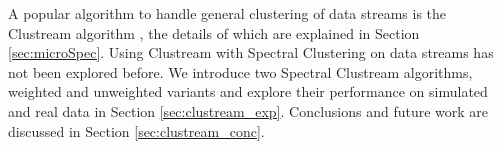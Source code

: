 A popular algorithm to handle general clustering of data streams is the Clustream algorithm \citep{Aggarwal2003}, the details of which are explained in Section \ref{sec:microSpec}. Using Clustream with Spectral Clustering on data streams has not been explored before.  We introduce two Spectral Clustream algorithms,  weighted and unweighted variants and explore their performance on simulated and real data in Section \ref{sec:clustream_exp}. Conclusions and future work are discussed in Section \ref{sec:clustream_conc}.






